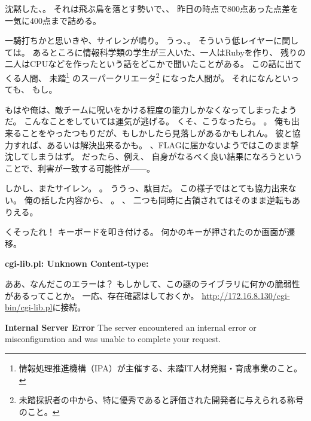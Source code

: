 沈黙した、。
それは飛ぶ鳥を落とす勢いで、、
昨日の時点で800点あった点差を一気に400点まで詰める。

一騎打ちかと思いきや、サイレンが鳴り。
うっ、。
そういう低レイヤーに関しては。
あるところに情報科学類の学生が三人いた、一人はRubyを作り、
残りの二人はCPUなどを作ったという話をどこかで聞いたことがある。
この話に出てくる人間、
未踏\footnote{情報処理推進機構（IPA）が主催する、未踏IT人材発掘・育成事業のこと。}%
のスーパークリエータ\footnote{未踏採択者の中から、特に優秀であると評価された開発者に与えられる称号のこと。}%
になった人間が。
それになんといっても、
もし。

もはや俺は、敵チームに呪いをかける程度の能力しかなくなってしまったようだ。
こんなことをしていては運気が逃げる。
くそ、こうなったら。
。
俺も出来ることをやったつもりだが、もしかしたら見落しがあるかもしれん。
彼と協力すれば、あるいは解決出来るかも。
、FLAGに届かないようではこのまま撃沈してしまうはず。
だったら、例え、
自身がなるべく良い結果になろうということで、利害が一致する可能性が------。

しかし、またサイレン。
。
ううっ、駄目だ。
この様子ではとても協力出来ない。
俺の話した内容から、
。
、
二つも同時に占領されてはそのまま逆転もありえる。

くそったれ！
キーボードを叩き付ける。
何かのキーが押されたのか画面が遷移。

\begin{screen}
\textbf{cgi-lib.pl: Unknown Content-type: }
\end{screen}

ああ、なんだこのエラーは？
もしかして、この謎のライブラリに何かの脆弱性があるってことか。
一応、存在確認はしておくか。
\url{http://172.16.8.130/cgi-bin/cgi-lib.pl}に接続。

\begin{itembox}[c]{\textbf{Internal Server Error}}
The server encountered an internal error or misconfiguration and 
was unable to complete your request.
\end{itembox}

